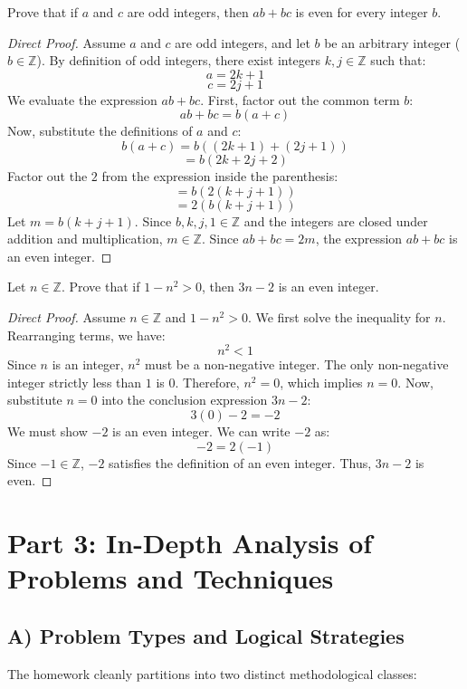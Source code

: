 \documentclass[11pt]{article}
\theoremstyle{remark}
\begin{document}
\begin{problem}[3.10]
Prove that if $a$ and $c$ are odd integers, then $ab + bc$ is even for every integer $b$.
\end{problem}
\begin{proof}[Direct Proof]
Assume $a$ and $c$ are odd integers, and let $b$ be an arbitrary integer ($b \in \mathbb{Z}$). 
By definition of odd integers, there exist integers $k, j \in \mathbb{Z}$ such that:
\[ a = 2k + 1 \]
\[ c = 2j + 1 \]
We evaluate the expression $ab + bc$. First, factor out the common term $b$:
\[ ab + bc = b(a + c) \]
Now, substitute the definitions of $a$ and $c$:
\[ b(a + c) = b((2k + 1) + (2j + 1)) \]
\[ = b(2k + 2j + 2) \]
Factor out the $2$ from the expression inside the parenthesis:
\[ = b(2(k + j + 1)) \]
\[ = 2(b(k + j + 1)) \]
Let $m = b(k + j + 1)$. Since $b, k, j, 1 \in \mathbb{Z}$ and the integers are closed under addition and multiplication, $m \in \mathbb{Z}$.
Since $ab + bc = 2m$, the expression $ab + bc$ is an even integer.
\end{proof}

\begin{problem}[3.11]
Let $n \in \mathbb{Z}$. Prove that if $1 - n^2 > 0$, then $3n - 2$ is an even integer.
\end{problem}
\begin{proof}[Direct Proof]
Assume $n \in \mathbb{Z}$ and $1 - n^2 > 0$. 
We first solve the inequality for $n$. Rearranging terms, we have:
\[ n^2 < 1 \]
Since $n$ is an integer, $n^2$ must be a non-negative integer. The only non-negative integer strictly less than $1$ is $0$. 
Therefore, $n^2 = 0$, which implies $n = 0$.
Now, substitute $n = 0$ into the conclusion expression $3n - 2$:
\[ 3(0) - 2 = -2 \]
We must show $-2$ is an even integer. We can write $-2$ as:
\[ -2 = 2(-1) \]
Since $-1 \in \mathbb{Z}$, $-2$ satisfies the definition of an even integer. Thus, $3n - 2$ is even.
\end{proof}

\newpage
\section{Part 3: In-Depth Analysis of Problems and Techniques}

\subsection{A) Problem Types and Logical Strategies}
The homework cleanly partitions into two distinct methodological classes:
\end{document}
